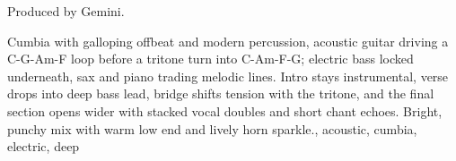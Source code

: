 

\begin{notes}
Produced by Gemini.
\end{notes}
\begin{prompt}
Cumbia with galloping offbeat and modern percussion, acoustic guitar driving a C-G-Am-F loop before a tritone turn into C-Am-F-G; electric bass locked underneath, sax and piano trading melodic lines. %
Intro stays instrumental, verse drops into deep bass lead, bridge shifts tension with the tritone, and the final section opens wider with stacked vocal doubles and short chant echoes. %
Bright, punchy mix with warm low end and lively horn sparkle., acoustic, cumbia, electric, deep
\end{prompt}
\sepbar

